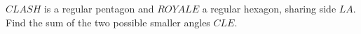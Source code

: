 $CLASH$ is a regular pentagon and $ROYALE$ a regular hexagon, sharing side $LA$. Find the sum of the two possible smaller angles $CLE$.
